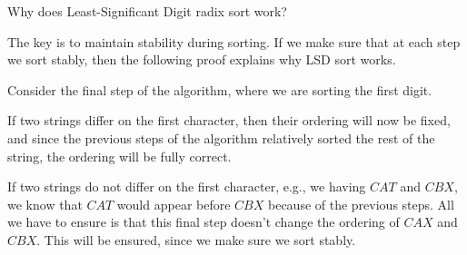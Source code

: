\begin{blocksection}
\question Why does Least-Significant Digit radix sort work?

\begin{solution}[1in]
The key is to maintain stability during sorting. If we make sure that at each
step we sort stably, then the following proof explains why LSD sort works.

Consider the final step of the algorithm, where we are sorting the first digit.

If two strings differ on the first character, then their ordering will now be
fixed, and since the previous steps of the algorithm relatively sorted the rest
of the string, the ordering will be fully correct.

If two strings do not differ on the first character, e.g., we having $CAT$ and
$CBX$, we know that $CAT$ would appear before $CBX$ because of the previous
steps. All we have to ensure is that this final step doesn't change the
ordering of $CAX$ and $CBX$. This will be ensured, since we make sure we sort
stably.
\end{solution}
\end{blocksection}
